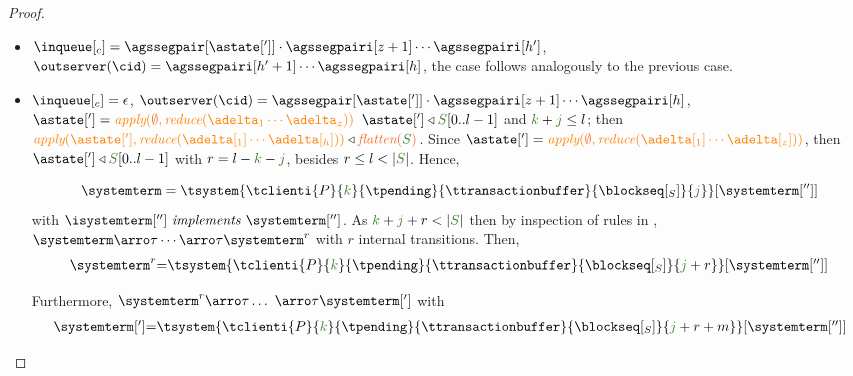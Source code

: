 \begin{proof}
\begin{itemize}
\begin{itemize}
\begin{itemize}
\begin{itemize}
					\end{itemize}	
					
					
				\item ${\inclient} = \agssegpair[{\astate[']}]\cdot\agssegpairi[{z+1}] \cdots \agssegpairi[h']$, 
              				  $\outserver(\cid) = \agssegpairi[h'+1] \cdots \agssegpairi[h]$, the case follows analogously to the previous case.


					
					\item  ${\inclient} = \epsilon$, 
     					          $\outserver(\cid) = \agssegpair[{\astate[']}]\cdot\agssegpairi[z+1] \cdots \agssegpairi[h]$, 
     						   $\astate['] = \iapply{\initialstate}{\ireduce{\adelta_1\cdots\adelta_{z}}}$
      						   $\astate['] \triangleleft \queuemessage[0 .. l - 1]$ and $\tknown+\treceivebuffer \leq l$;  
					then $\iapply{\astate[']}{\ireduce{\adelta[_1]\cdots\adelta[_{h}]}}\triangleleft \flatten{\queuemessage}$. 
					Since $\astate['] = \iapply{\initialstate}{\ireduce{\adelta[_1]\cdots\adelta[_{z}]}}$, then $\astate[']\triangleleft \queuemessage[0..l-1]$ with $r = l - \tknown - \treceivebuffer$, besides $r \leq l < |\queuemessage|$.  Hence,
				
				\[\systemterm = \tsystem{\tclienti{\tprogram}{\tknown}{\tpending}{\ttransactionbuffer}{\tsent}{\treceivebuffer}}[{\systemterm['']}] \]
				with $\implements{\isystemterm['']}{\systemterm['']}$. As $\tknown+ \treceivebuffer + r < |\queuemessage|$ then by inspection of rules in 				, 
				$\systemterm \arroi{\tau}\cdots\arroi{\tau} \systemterm^{r}$ with $r$ internal transitions. Then,
				\[\begin{array}{r@{=}l}
						\systemterm^{r} & \tsystem{\tclienti{\tprogram}{\tknown}{\tpending}{\ttransactionbuffer}{\tsent}{\treceivebuffer+r}}[{\systemterm['']}]	
				  \end{array}		
				\]
				
				Furthermore,
				$\systemterm^{r} \arroi{\tau} \ldots\ \arroi{\tau} \systemterm[']$ with
				\[\begin{array}{r@{=}l}
					\systemterm['] &  \tsystem{\tclienti{\tprogram}{\tknown}{\tpending}{\ttransactionbuffer}{\tsent}{\treceivebuffer + r + m}}[{\systemterm['']}] \\
				  \end{array}		
				\]



\end{itemize}
\end{itemize}
\end{itemize}
\end{proof}

